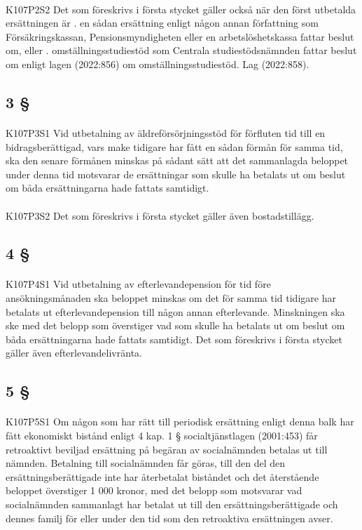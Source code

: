 \documentclass[a4paper,notitlepage,openany,10pt]{book}
\begin{document}
\paragraph*{}
{\tiny K107P2S2}
Det som föreskrivs i första stycket gäller också när den först utbetalda ersättningen är
. en sådan ersättning enligt någon annan författning som Försäkringskassan, Pensionsmyndigheten eller en arbetslöshetskassa fattar beslut om, eller
. omställningsstudiestöd som Centrala studiestödsnämnden fattar beslut om enligt lagen (2022:856) om omställningsstudiestöd.
Lag (2022:858).
\subsection*{3 §}
\paragraph*{}
{\tiny K107P3S1}
Vid utbetalning av äldreförsörjningsstöd för förfluten tid till en bidragsberättigad, vars make tidigare har fått en sådan förmån för samma tid, ska den senare förmånen minskas på sådant sätt att det sammanlagda beloppet under denna tid motsvarar de ersättningar som skulle ha betalats ut om beslut om båda ersättningarna hade fattats samtidigt.
\paragraph*{}
{\tiny K107P3S2}
Det som föreskrivs i första stycket gäller även bostadstillägg.
\subsection*{4 §}
\paragraph*{}
{\tiny K107P4S1}
Vid utbetalning av efterlevandepension för tid före ansökningsmånaden ska beloppet minskas om det för samma tid tidigare har betalats ut efterlevandepension till någon annan efterlevande. Minskningen ska ske med det belopp som överstiger vad som skulle ha betalats ut om beslut om båda ersättningarna hade fattats samtidigt.
Det som föreskrivs i första stycket gäller även efterlevandelivränta.
\subsection*{5 §}
\paragraph*{}
{\tiny K107P5S1}
Om någon som har rätt till periodisk ersättning enligt denna balk har fått ekonomiskt bistånd enligt 4 kap. 1 § socialtjänstlagen (2001:453) får retroaktivt beviljad ersättning på begäran av socialnämnden betalas ut till nämnden. Betalning till socialnämnden får göras, till den del den ersättningsberättigade inte har återbetalat biståndet och det återstående beloppet överstiger 1 000 kronor, med det belopp som motsvarar vad socialnämnden sammanlagt har betalat ut till den ersättningsberättigade och dennes familj för eller under den tid som den retroaktiva ersättningen avser.
\end{document}
